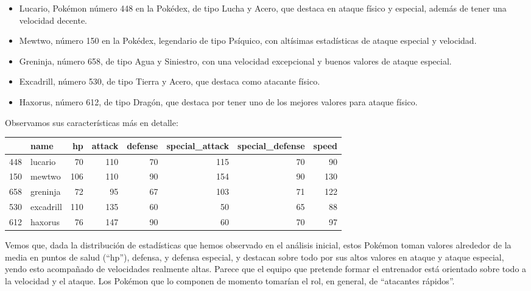 \documentclass[
  12pt,
]{extreport}
\begin{document}
\begin{itemize}
\item
  Lucario, Pokémon número 448 en la Pokédex, de tipo Lucha y Acero, que
  destaca en ataque físico y especial, además de tener una velocidad
  decente.
\item
  Mewtwo, número 150 en la Pokédex, legendario de tipo Psíquico, con
  altísimas estadísticas de ataque especial y velocidad.
\item
  Greninja, número 658, de tipo Agua y Siniestro, con una velocidad
  excepcional y buenos valores de ataque especial.
\item
  Excadrill, número 530, de tipo Tierra y Acero, que destaca como
  atacante físico.
\item
  Haxorus, número 612, de tipo Dragón, que destaca por tener uno de los
  mejores valores para ataque físico.
\end{itemize}

Observamos sus características más en detalle:

\begin{table}[H]
\centering\begingroup\fontsize{10.5}{12.5}\selectfont

\begin{tabular}{llrrrrrr}
\toprule
  & name & hp & attack & defense & special\_attack & special\_defense & speed\\
\midrule
448 & lucario & 70 & 110 & 70 & 115 & 70 & 90\\
150 & mewtwo & 106 & 110 & 90 & 154 & 90 & 130\\
658 & greninja & 72 & 95 & 67 & 103 & 71 & 122\\
530 & excadrill & 110 & 135 & 60 & 50 & 65 & 88\\
612 & haxorus & 76 & 147 & 90 & 60 & 70 & 97\\
\bottomrule
\end{tabular}
\endgroup{}
\end{table}

Vemos que, dada la distribución de estadísticas que hemos observado en
el análisis inicial, estos Pokémon toman valores alrededor de la media
en puntos de salud (``hp''), defensa, y defensa especial, y destacan
sobre todo por sus altos valores en ataque y ataque especial, yendo esto
acompañado de velocidades realmente altas. Parece que el equipo que
pretende formar el entrenador está orientado sobre todo a la velocidad y
el ataque. Los Pokémon que lo componen de momento tomarían el rol, en
general, de ``atacantes rápidos''.
\end{document}
